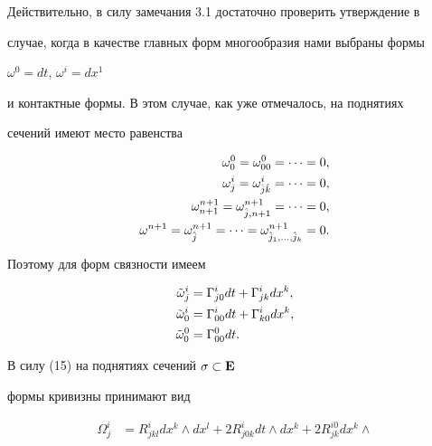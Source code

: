 \begin{pf} 


Действительно, в силу замечания 3.1 достаточно проверить утверждение в 


случае, когда в качестве главных форм многообразия нами выбраны формы 


$\omega^0=dt$, $\omega^i=dx^1$ 


и контактные формы. В этом случае, как уже отмечалось, на поднятиях  


сечений имеют место равенства 


\begin{equation} 


\begin{split} 


\omega^0_0=\omega^0_{00}=\dotsb&=0,\\ 


\omega^i_j=\omega^i_{\Hat j\Hat k}=\dotsb&=0,\\ 


\omega^{n+1}_{n+1}=\omega^{n+1}_{\Hat j,n+1}=\dotsb&=0,\\ 


\omega^{n+1}=\omega^{n+1}_{\Hat j}=\dotsb = 


\omega^{n+1}_{\Hat j_1,\dotsc,\Hat j_k}&=0. 


\end{split} 


\end{equation} 


Поэтому для форм связности имеем 


\begin{align*} 


\Tilde\omega^i_j&=\Gamma^i_{j0}dt+\Gamma^i_{jk}dx^k,\\ 


\Tilde\omega^i_0&=\Gamma^i_{00}dt+\Gamma^i_{k0}dx^k,\\ 


\Tilde\omega^0_0&=\Gamma^0_{00}dt. 


\end{align*} 


В силу (15) на поднятиях сечений $\sigma\subset\bold E$ 


формы кривизны принимают вид 


\begin{align*} 


\Omega^i_j&=R^i_{jkl}dx^k\wedge dx^l+ 


2R^i_{j0k}dt\wedge dx^k+ 2R^{i0}_{jk}dx^k\wedge 



\end{align*}
\end{pf}
